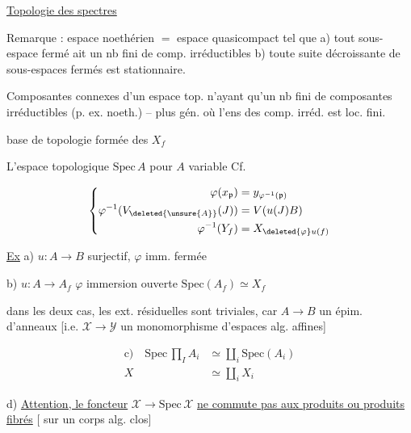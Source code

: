 
\uline{Topologie des spectres}

Remarque : espace noethérien $=$  espace quasicompact tel que a) tout sous-espace fermé ait un nb fini de comp. irréductibles b) toute suite décroissante de sous-espaces fermés  est stationnaire.

Composantes connexes d'un espace top. n'ayant qu'un nb fini de composantes irréductibles (p. ex. noeth.) -- plus gén. où l'ens des comp. irréd. est loc. fini.

 base de topologie formée des $X_f$ 

L'espace topologique $\mathrm{Spec}\,A$ pour $A$ variable \quad Cf.


\[
\left\{\begin{aligned}
\varphi(x_{\mathfrak p})&=y_{\varphi^{-1}(\mathfrak p)}\\
\varphi^{-1}(V_{\deleted{\unsure{A}}}(J))&=V(u(J)B)\\
\varphi^{-1}(Y_f)&=X_{\deleted{\varphi}u(f)}
\end{aligned}\right.
\]

\uline{Ex} a)  $u:A\to B$ surjectif, $\varphi$ imm. fermée

b)  $u:A\to A_f$ \qquad $\varphi$ immersion ouverte \qquad $\mathrm{Spec}(A_f)\simeq X_f$

dans les deux cas, les ext. résiduelles sont triviales, car $A\to B$ un épim. d'anneaux [i.e. $\mathscr X\to\mathscr Y$ un monomorphisme d'espaces alg. affines]

\[
\begin{aligned}
\text{c)}\quad \mathrm{Spec}\,\prod_I A_i&\simeq\coprod_i\mathrm{Spec}(A_i)\\
X&\simeq\coprod_i X_i
\end{aligned}
\]

d) \uline{Attention, le foncteur} $\mathscr X\to\mathrm{Spec}\,\mathscr X$ \uline{ne commute pas aux produits ou produits fibrés} [ sur un corps alg. clos]

